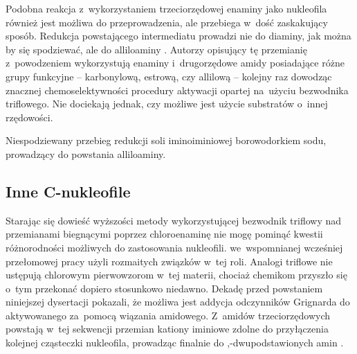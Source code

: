 Podobna reakcja z~wykorzystaniem trzeciorzędowej enaminy  jako nukleofila również jest możliwa do przeprowadzenia,
  ale przebiega w~dość zaskakujący sposób.
Redukcja powstającego intermediatu  prowadzi nie do diaminy,
  jak można by się spodziewać, ale do alliloaminy .
Autorzy opisujący tę przemianię z~powodzeniem wykorzystują enaminy i~drugorzędowe amidy posiadające różne grupy funkcyjne \---
  karbonylową, estrową, czy allilową \--- kolejny raz dowodząc znacznej chemoselektywności procedury aktywacji opartej na~użyciu bezwodnika triflowego.
Nie dociekają jednak, czy możliwe jest użycie substratów o~innej rzędowości.
\begin{scheme*}
  \centering
  
  \caption{
    Niespodziewany przebieg redukcji soli iminoiminiowej  borowodorkiem sodu,
    prowadzący do powstania alliloaminy.
  }
  \label{sch:allyloamine-synthesis}
\end{scheme*}

\subsection{Inne C-nukleofile}\label{literature:triflic:c-nucleophiles}
Starając się dowieść wyższości metody wykorzystującej bezwodnik triflowy nad przemianami biegnącymi
  poprzez chloroenaminę nie mogę pominąć kwestii różnorodności możliwych do zastosowania nukleofili.
\citeauthor{ghosez69} we~wspomnianej wcześniej przełomowej pracy użyli rozmaitych związków w~tej roli.
Analogi triflowe nie ustępują chlorowym pierwowzorom w~tej materii,
  chociaż chemikom przyszło się o~tym przekonać dopiero stosunkowo niedawno.
Dekadę przed powstaniem niniejszej dysertacji \citeauthor{xiao10} pokazali,
  że możliwa jest addycja odczynników Grignarda do aktywowanego za~pomocą  wiązania amidowego.
Z~amidów trzeciorzędowych  powstają w~tej sekwencji przemian kationy iminiowe
   zdolne do przyłączenia kolejnej cząsteczki nukleofila,
  prowadząc finalnie do \textalpha,\textalpha-dwupodstawionych amin .

